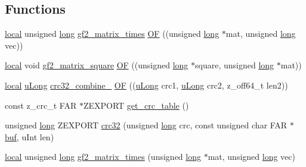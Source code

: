 \subsection*{Functions}
\begin{DoxyCompactItemize}
\item 
\mbox{\hyperlink{zutil_8h_a08023ea6765c99d60a6a3840cd07156e}{local}} unsigned \mbox{\hyperlink{ioapi_8h_a3c7b35ad9dab18b8310343c201f7b27e}{long}} \mbox{\hyperlink{third-party_2zlib_2crc32_8c_a388bdea9cd672b42ff9d424c3357a71c}{gf2\+\_\+matrix\+\_\+times}} \mbox{\hyperlink{third-party_2zlib_2crc32_8c_ab5e9ce61df5c0090a4c91ed4df20bd15}{OF}} ((unsigned \mbox{\hyperlink{ioapi_8h_a3c7b35ad9dab18b8310343c201f7b27e}{long}} $\ast$mat, unsigned \mbox{\hyperlink{ioapi_8h_a3c7b35ad9dab18b8310343c201f7b27e}{long}} vec))
\item 
\mbox{\hyperlink{zutil_8h_a08023ea6765c99d60a6a3840cd07156e}{local}} void \mbox{\hyperlink{third-party_2zlib_2crc32_8c_a797362ba54180ad549b381abfcde80c3}{gf2\+\_\+matrix\+\_\+square}} \mbox{\hyperlink{third-party_2zlib_2crc32_8c_a97302400540a4804a933ce8f829f1517}{OF}} ((unsigned \mbox{\hyperlink{ioapi_8h_a3c7b35ad9dab18b8310343c201f7b27e}{long}} $\ast$square, unsigned \mbox{\hyperlink{ioapi_8h_a3c7b35ad9dab18b8310343c201f7b27e}{long}} $\ast$mat))
\item 
\mbox{\hyperlink{zutil_8h_a08023ea6765c99d60a6a3840cd07156e}{local}} \mbox{\hyperlink{ioapi_8h_a50e9e9d5c30e481de822ad68fe537986}{u\+Long}} \mbox{\hyperlink{third-party_2zlib_2crc32_8c_a36a8eb95bf402949b5a68f7157df7ca2}{crc32\+\_\+combine\+\_\+}} \mbox{\hyperlink{third-party_2zlib_2crc32_8c_aafbb122e835f0f7f8e60a29d785fc0a9}{OF}} ((\mbox{\hyperlink{ioapi_8h_a50e9e9d5c30e481de822ad68fe537986}{u\+Long}} crc1, \mbox{\hyperlink{ioapi_8h_a50e9e9d5c30e481de822ad68fe537986}{u\+Long}} crc2, z\+\_\+off64\+\_\+t len2))
\item 
const z\+\_\+crc\+\_\+t F\+AR $\ast$Z\+E\+X\+P\+O\+RT \mbox{\hyperlink{third-party_2zlib_2crc32_8c_a7d4540ffeee6cb5c74978e3040b7a69a}{get\+\_\+crc\+\_\+table}} ()
\item 
unsigned \mbox{\hyperlink{ioapi_8h_a3c7b35ad9dab18b8310343c201f7b27e}{long}} Z\+E\+X\+P\+O\+RT \mbox{\hyperlink{third-party_2zlib_2crc32_8c_af5a1c7b05170540ef3bb084e6cf903c4}{crc32}} (unsigned \mbox{\hyperlink{ioapi_8h_a3c7b35ad9dab18b8310343c201f7b27e}{long}} crc, const unsigned char F\+AR $\ast$\mbox{\hyperlink{ioapi_8h_a8ad8a13c88886b9f623034ff88570adb}{buf}}, u\+Int len)
\item 
\mbox{\hyperlink{zutil_8h_a08023ea6765c99d60a6a3840cd07156e}{local}} unsigned \mbox{\hyperlink{ioapi_8h_a3c7b35ad9dab18b8310343c201f7b27e}{long}} \mbox{\hyperlink{third-party_2zlib_2crc32_8c_a388bdea9cd672b42ff9d424c3357a71c}{gf2\+\_\+matrix\+\_\+times}} (unsigned \mbox{\hyperlink{ioapi_8h_a3c7b35ad9dab18b8310343c201f7b27e}{long}} $\ast$mat, unsigned \mbox{\hyperlink{ioapi_8h_a3c7b35ad9dab18b8310343c201f7b27e}{long}} vec)

\end{DoxyCompactItemize}
